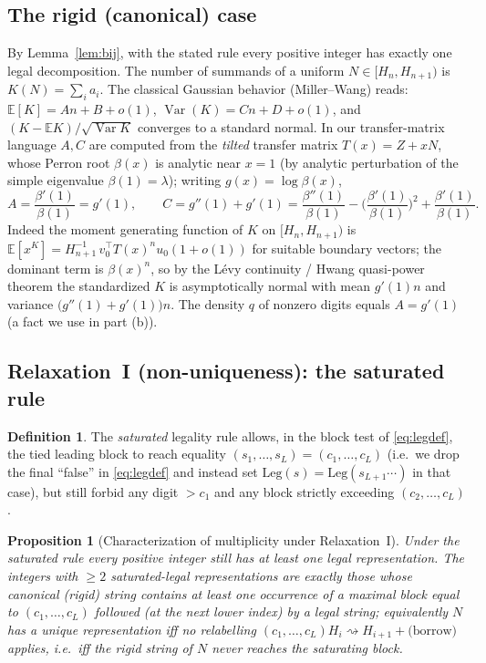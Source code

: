 \documentclass[12pt]{article}
\newtheorem{proposition}{Proposition}
\theoremstyle{definition}
\newtheorem{definition}{Definition}
\DeclareMathOperator{\Var}{Var}
\newcommand{\E}{\mathbb{E}}
\begin{document}
\subsection{The rigid (canonical) case}
By Lemma~\ref{lem:bij}, with the stated rule every positive integer has exactly
one legal decomposition. The number of summands of a uniform $N\in[H_n,H_{n+1})$
is $K(N)=\sum_i a_i$. The classical Gaussian behavior (Miller--Wang) reads:
$\E[K]=An+B+o(1)$, $\Var(K)=Cn+D+o(1)$, and $(K-\E K)/\sqrt{\Var K}$ converges to
a standard normal. In our transfer-matrix language $A,C$ are computed from the
\emph{tilted} transfer matrix $T(x)=Z+xN$, whose Perron root $\beta(x)$ is
analytic near $x=1$ (by analytic perturbation of the simple eigenvalue
$\beta(1)=\lambda$); writing $g(x)=\log\beta(x)$,
\begin{equation}\label{eq:ACrigid}
A=\frac{\beta'(1)}{\beta(1)}=g'(1),\qquad
C=g''(1)+g'(1)=\frac{\beta''(1)}{\beta(1)}-\Big(\frac{\beta'(1)}{\beta(1)}\Big)^2+\frac{\beta'(1)}{\beta(1)} .
\end{equation}
Indeed the moment generating function of $K$ on $[H_n,H_{n+1})$ is
$\E[x^{K}]=H_{n+1}^{-1}\,v_0^\top T(x)^n u_0(1+o(1))$ for suitable boundary
vectors; the dominant term is $\beta(x)^n$, so by the Lévy continuity / Hwang
quasi-power theorem the standardized $K$ is asymptotically normal with mean
$g'(1)n$ and variance $\big(g''(1)+g'(1)\big)n$. The density $q$ of nonzero
digits equals $A=g'(1)$ (a fact we use in part (b)).

\subsection{Relaxation~I (non-uniqueness): the saturated rule}
\begin{definition}\label{def:sat}
The \emph{saturated} legality rule allows, in the block test of
\eqref{eq:legdef}, the tied leading block to reach equality
$(s_1,\dots,s_L)=(c_1,\dots,c_L)$ (i.e.\ we drop the final ``false'' in
\eqref{eq:legdef} and instead set $\mathrm{Leg}(s)=\mathrm{Leg}(s_{L+1}\cdots)$ in
that case), but still forbid any digit $>c_1$ and any block strictly exceeding
$(c_2,\dots,c_L)$.
\end{definition}

\begin{proposition}[Characterization of multiplicity under Relaxation~I]
\label{prop:multi}
Under the saturated rule every positive integer still has at least one legal
representation. The integers with $\ge2$ saturated-legal representations are
exactly those whose canonical (rigid) string contains at least one occurrence of
a maximal block equal to $(c_1,\dots,c_L)$ followed (at the next lower index) by
a legal string; equivalently $N$ has a unique representation iff no relabelling
$(c_1,\dots,c_L)H_{i}\rightsquigarrow H_{i+1}+\big(\text{borrow}\big)$ applies,
i.e.\ iff the rigid string of $N$ never reaches the saturating block.
\end{proposition}
\end{document}
